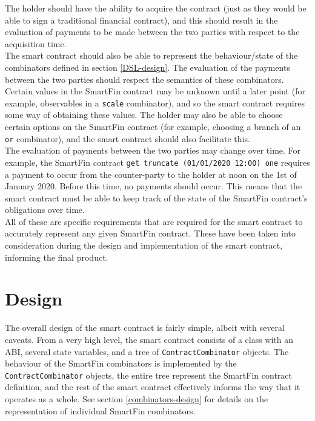 The holder should have the ability to acquire the contract (just as they would be able to sign a traditional financial contract), and this should result in the evaluation of payments to be made between the two parties with respect to the acquisition time. \\

The smart contract should also be able to represent the behaviour/state of the combinators defined in section \ref{DSL-design}. The evaluation of the payments between the two parties should respect the semantics of these combinators. \\

Certain values in the SmartFin contract may be unknown until a later point (for example, observables in a \texttt{scale} combinator), and so the smart contract requires some way of obtaining these values. The holder may also be able to choose certain options on the SmartFin contract (for example, choosing a branch of an \texttt{or} combinator), and the smart contract should also facilitate this. \\

The evaluation of payments between the two parties may change over time. For example, the SmartFin contract \texttt{get truncate (01/01/2020 12:00) one} requires a payment to occur from the counter-party to the holder at noon on the 1st of January 2020. Before this time, no payments should occur. This means that the smart contract must be able to keep track of the state of the SmartFin contract's obligations over time. \\

All of these are specific requirements that are required for the smart contract to accurately represent any given SmartFin contract. These have been taken into consideration during the design and implementation of the smart contract, informing the final product.


\section{Design} \label{contract-design}

The overall design of the smart contract is fairly simple, albeit with several caveats. From a very high level, the smart contract consists of a class with an ABI, several state variables, and a tree of \texttt{ContractCombinator} objects. The behaviour of the SmartFin combinators is implemented by the \texttt{ContractCombinator} objects, the entire tree represent the SmartFin contract definition, and the rest of the smart contract effectively informs the way that it operates as a whole. See section \ref{combinators-design} for details on the representation of individual SmartFin combinators.


